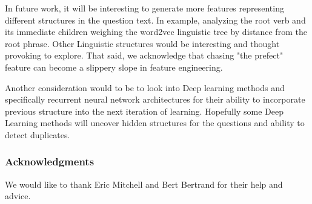 \documentclass{article} %
\begin{document}
In future work, it will be interesting to generate more features representing different structures in the question text. In example, analyzing the root verb and its immediate children weighing the word2vec linguistic tree by distance from the root phrase. Other Linguistic structures would be interesting and thought provoking to explore. That said, we acknowledge that chasing "the prefect" feature can become a slippery slope in feature engineering.

Another consideration would to be to look into Deep learning methods and specifically recurrent neural network architectures for their ability to incorporate previous structure into the next iteration of learning. Hopefully some Deep Learning methods will uncover hidden structures for the questions and ability to detect duplicates.

\subsubsection*{Acknowledgments}

We would like to thank Eric Mitchell and Bert Bertrand for their help and advice.

\printbibliography
\end{document}
